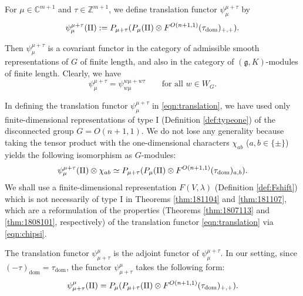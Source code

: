 \begin{definition}
\label{def:transG}
For $\mu \in {\mathbb{C}}^{m+1}$ and $\tau \in {\mathbb{Z}}^{m+1}$, 
 we define translation functor $\psi_{\mu}^{\mu+\tau}$ by 
\begin{equation}
\label{eqn:translation}
   \psi_{\mu}^{\mu+\tau}(\Pi)
   :=
   P_{\mu+\tau}(P_{\mu}(\Pi) \otimes F^{{O(n+1,1)}}({\tau_{\operatorname{dom}}})_{+,+}).  
\end{equation}
\end{definition}
Then $\psi_{\mu}^{\mu+\tau}$ is a covariant functor
 in the category of admissible smooth representations of $G$
 of finite length, 
 and also  
 in the category
 of $({\mathfrak{g}},K)$-modules of finite length.  
Clearly,
 we have 
\begin{equation}
\label{eqn:V731}
  \psi_{\mu}^{\mu+\tau}=\psi_{w\mu}^{w\mu+w\tau}
\qquad
\text{for all $w \in W_G$.}
\end{equation}


In defining the translation functor $\psi_{\mu}^{\mu+\tau}$
 in \eqref{eqn:translation}, 
 we have used only finite-dimensional representations
 of type I
 (Definition \ref{def:typeone})
 of the disconnected group $G=O(n+1,1)$.  
We do not lose any generality
 because taking the tensor product
 with the one-dimensional characters
 $\chi_{a b}$
 ($a, b \in \{\pm\}$)
 yields the following isomorphism as $G$-modules:
\begin{equation}
\label{eqn:chipsi}
   \psi_{\mu}^{\mu+\tau}(\Pi) \otimes \chi_{a b}
   \simeq 
   P_{\mu+\tau}
   (P_{\mu}(\Pi) \otimes 
    F^{{O(n+1,1)}}({\tau_{\operatorname{dom}}})_{a,b}).  
\end{equation}
We shall use a finite-dimensional representation
 $F(V,\lambda)$
 (Definition \ref{def:Fshift})
 which is not necessarily of type I
 in Theorems \ref{thm:181104} and \ref{thm:181107}, 
 which are a reformulation of the properties
 (Theorems \ref{thm:1807113} and \ref{thm:1808101}, respectively)
 of the translation functor
 \eqref{eqn:translation}
 via \eqref{eqn:chipsi}.  



The translation functor $\psi_{\mu+\tau}^{\mu}$ is the adjoint functor
 of $\psi_{\mu}^{\mu+\tau}$.  
In our setting, 
 since $(-\tau)_{\operatorname{dom}}=\tau_{\operatorname{dom}}$, 
 the functor $\psi_{\mu+\tau}^{\mu}$
 takes the following form:
\[
  \psi_{\mu+\tau}^{\mu}(\Pi)
  =
  P_{\mu}
  (P_{\mu+\tau}(\Pi) \otimes 
   F^{{O(n+1,1)}}({\tau_{\operatorname{dom}}})_{+,+}).  
\]



